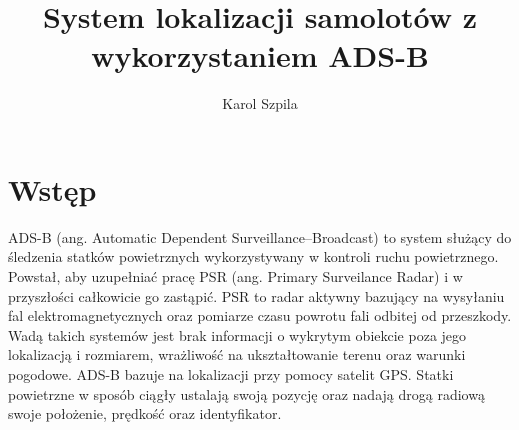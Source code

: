 \documentclass[eng,printmode]{mgr}
\title{System lokalizacji samolotów z wykorzystaniem ADS-B}
\author{Karol Szpila}
\begin{document}

\maketitle %

\tableofcontents %

\let\cleardoublepage\clearpage %

\chapter{ Wstęp }
ADS-B (ang. Automatic Dependent Surveillance–Broadcast) to system służący do śledzenia statków powietrznych wykorzystywany w kontroli ruchu powietrznego. Powstał, aby uzupełniać pracę PSR (ang. Primary Surveilance Radar) i w przyszłości całkowicie go zastąpić. PSR to radar aktywny bazujący na wysyłaniu fal elektromagnetycznych oraz pomiarze czasu powrotu fali odbitej od przeszkody. Wadą takich systemów jest brak informacji o wykrytym obiekcie poza jego lokalizacją i rozmiarem, wrażliwość na ukształtowanie terenu oraz warunki pogodowe. ADS-B bazuje na lokalizacji przy pomocy satelit GPS. Statki powietrzne w sposób ciągły ustalają swoją pozycję oraz nadają drogą radiową swoje położenie, prędkość oraz identyfikator.
\\
\end{document}
